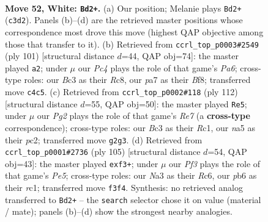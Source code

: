 \documentclass[11pt]{article}
\begin{document}
\clearpage

\begin{figure}[p]\centering
\begin{subfigure}{0.46\textwidth}\centering
\resizebox{\linewidth}{!}{%
\newchessgame
\chessboard[
  setfen={6r1/p7/1pr1p2p/n5k1/2P1p3/N1B2P2/P3K1PR/2R5 w - - 0 52},
  showmover=false,
  pgfstyle=straightmove, color=movearrow, markmove={c3-d2}
]}
\caption{}
\end{subfigure}\hfill
\begin{subfigure}{0.46\textwidth}\centering
\resizebox{\linewidth}{!}{%
\newchessgame
\chessboard[
  setfen={2r2b1k/r6p/8/3N3R/1p1P2pP/p1P1K1P1/2P5/R7 b - - 1 51},
  showmover=false,
  pgfstyle=straightmove, color=movearrow, markmove={a3-a2}
]}
\caption{}
\end{subfigure}
\\[4pt]
\begin{subfigure}{0.46\textwidth}\centering
\resizebox{\linewidth}{!}{%
\newchessgame
\chessboard[
  setfen={1rr3k1/4R1p1/7p/1P5P/5p2/1N2P3/p1p2PP1/2R2K2 w - - 2 57},
  showmover=false,
  pgfstyle=straightmove, color=movearrow, markmove={e7-e5}
]}
\caption{}
\end{subfigure}\hfill
\begin{subfigure}{0.46\textwidth}\centering
\resizebox{\linewidth}{!}{%
\newchessgame
\chessboard[
  setfen={8/3r2k1/2r3p1/4b2p/4pN1P/2p1PPP1/2R3K1/2R5 b - - 0 53},
  showmover=false,
  pgfstyle=straightmove, color=movearrow, markmove={e4-f3}
]}
\caption{}
\end{subfigure}
\caption{\textbf{Move 52, White: \texttt{Bd2+}.} (a) Our position; Melanie plays \texttt{Bd2+} (\texttt{c3d2}). Panels (b)--(d) are the retrieved master positions whose correspondence most drove this move (highest QAP objective among those that transfer to it). (b) Retrieved from \texttt{ccrl\_top\_p0003\#2549} (ply 101) [structural distance $d$=44, QAP obj=74]: the master played \texttt{a2}; under $\mu$ our \emph{Pc4} plays the role of that game's \emph{Pa6}; cross-type roles: our \emph{B}c3 as their \emph{R}c8, our \emph{p}a7 as their \emph{B}f8; transferred move \texttt{c4c5}. (c) Retrieved from \texttt{ccrl\_top\_p0002\#118} (ply 112) [structural distance $d$=55, QAP obj=50]: the master played \texttt{Re5}; under $\mu$ our \emph{Pg2} plays the role of that game's \emph{Re7} (a \textbf{cross-type} correspondence); cross-type roles: our \emph{B}c3 as their \emph{R}c1, our \emph{n}a5 as their \emph{p}c2; transferred move \texttt{g2g3}. (d) Retrieved from \texttt{ccrl\_top\_p0001\#2736} (ply 105) [structural distance $d$=54, QAP obj=43]: the master played \texttt{exf3+}; under $\mu$ our \emph{Pf3} plays the role of that game's \emph{Pe5}; cross-type roles: our \emph{N}a3 as their \emph{R}c6, our \emph{p}b6 as their \emph{r}c1; transferred move \texttt{f3f4}. Synthesis: no retrieved analog transferred to \texttt{Bd2+} -- the \texttt{search} selector chose it on value (material / mate); panels (b)--(d) show the strongest nearby analogies.}
\label{fig:thought-m102}
\end{figure}
\end{document}
